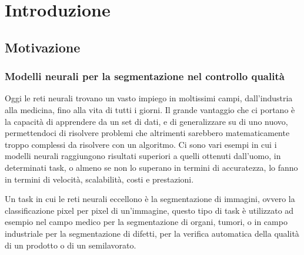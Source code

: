 \chapter{Introduzione}

\section{Motivazione \ok}

\subsection{Modelli neurali per la segmentazione nel controllo qualità\ok}

Oggi le reti neurali trovano un vasto impiego in moltissimi campi, dall'industria alla medicina, fino alla vita di tutti i giorni.
Il grande vantaggio che ci portano è la capacità di apprendere da un set di dati, e di generalizzare su di uno nuovo,
permettendoci di risolvere problemi che altrimenti sarebbero matematicamente troppo complessi da risolvere con un algoritmo.
Ci sono vari esempi in cui i modelli neurali raggiungono risultati superiori a quelli ottenuti dall'uomo, in determinati task, 
o almeno se non lo superano in termini di accuratezza, lo fanno in termini di velocità, scalabilità, costi e prestazioni.

Un task in cui le reti neurali eccellono è la segmentazione di immagini, ovvero la classificazione pixel per pixel di un'immagine,
questo tipo di task è utilizzato ad esempio nel campo medico per la segmentazione di organi, tumori, o in campo industriale per la segmentazione di difetti,
per la verifica automatica della qualità di un prodotto o di un semilavorato.

